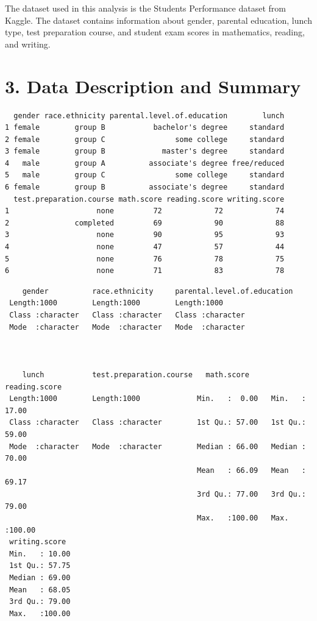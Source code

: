 \documentclass[
  letterpaper,
  DIV=11,
  numbers=noendperiod]{scrartcl}
\newcounter{none} %
\begin{document}
The dataset used in this analysis is the Students Performance dataset
from Kaggle. The dataset contains information about gender, parental
education, lunch type, test preparation course, and student exam scores
in mathematics, reading, and writing.

\section{3. Data Description and
Summary}\label{data-description-and-summary}

\begin{verbatim}
  gender race.ethnicity parental.level.of.education        lunch
1 female        group B           bachelor's degree     standard
2 female        group C                some college     standard
3 female        group B             master's degree     standard
4   male        group A          associate's degree free/reduced
5   male        group C                some college     standard
6 female        group B          associate's degree     standard
  test.preparation.course math.score reading.score writing.score
1                    none         72            72            74
2               completed         69            90            88
3                    none         90            95            93
4                    none         47            57            44
5                    none         76            78            75
6                    none         71            83            78
\end{verbatim}

\begin{verbatim}
    gender          race.ethnicity     parental.level.of.education
 Length:1000        Length:1000        Length:1000                
 Class :character   Class :character   Class :character           
 Mode  :character   Mode  :character   Mode  :character           
                                                                  
                                                                  
                                                                  
    lunch           test.preparation.course   math.score     reading.score   
 Length:1000        Length:1000             Min.   :  0.00   Min.   : 17.00  
 Class :character   Class :character        1st Qu.: 57.00   1st Qu.: 59.00  
 Mode  :character   Mode  :character        Median : 66.00   Median : 70.00  
                                            Mean   : 66.09   Mean   : 69.17  
                                            3rd Qu.: 77.00   3rd Qu.: 79.00  
                                            Max.   :100.00   Max.   :100.00  
 writing.score   
 Min.   : 10.00  
 1st Qu.: 57.75  
 Median : 69.00  
 Mean   : 68.05  
 3rd Qu.: 79.00  
 Max.   :100.00  
\end{verbatim}
\end{document}
